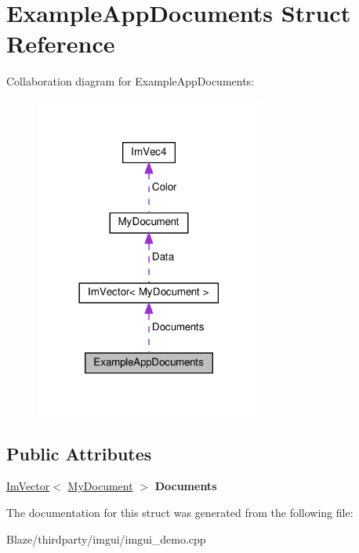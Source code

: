 \hypertarget{structExampleAppDocuments}{}\section{Example\+App\+Documents Struct Reference}
\label{structExampleAppDocuments}


Collaboration diagram for Example\+App\+Documents\+:\nopagebreak
\begin{figure}[H]
\begin{center}
\leavevmode
\includegraphics[width=213pt]{structExampleAppDocuments__coll__graph}
\end{center}
\end{figure}
\subsection*{Public Attributes}
\begin{DoxyCompactItemize}
\item 
\mbox{\label{structExampleAppDocuments_a6f8cc955192c924720b0413ae7980c12}} 
\hyperlink{structImVector}{Im\+Vector}$<$ \hyperlink{structMyDocument}{My\+Document} $>$ {\bfseries Documents}
\end{DoxyCompactItemize}


The documentation for this struct was generated from the following file\+:\begin{DoxyCompactItemize}
\item 
Blaze/thirdparty/imgui/imgui\+\_\+demo.\+cpp\end{DoxyCompactItemize}
